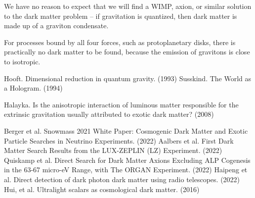 \documentclass[12pt]{article}
\begin{document}
We have no reason to expect that we will find a WIMP, axion, or similar solution \cite{berger, aalbers, quiskamp, haipeng, hui} to the dark matter problem -- if gravitation is quantized, then dark matter is made up of a graviton condensate.

For processes bound by all four forces, such as protoplanetary disks, there is practically no dark matter to be found, because the emission of gravitons is close to isotropic.


\pagebreak



\begin{thebibliography}{9}
 Hooft. Dimensional reduction in quantum gravity. (1993)
 Susskind. The World as a Hologram. (1994)

 Halayka. Is the anisotropic interaction of luminous matter responsible for the extrinsic gravitation usually attributed to exotic dark matter? (2008)

 Berger et al. Snowmass 2021 White Paper: Cosmogenic Dark Matter and Exotic Particle Searches in Neutrino Experiments. (2022)
 Aalbers et al. First Dark Matter Search Results from the LUX-ZEPLIN (LZ) Experiment. (2022)
 Quiskamp et al. Direct Search for Dark Matter Axions Excluding ALP Cogenesis in the 63-67 micro-eV Range, with The ORGAN Experiment. (2022)
 Haipeng et al. Direct detection of dark photon dark matter using radio telescopes. (2022)
 Hui, et al. Ultralight scalars as cosmological dark matter. (2016)


\end{thebibliography}
\end{document}
